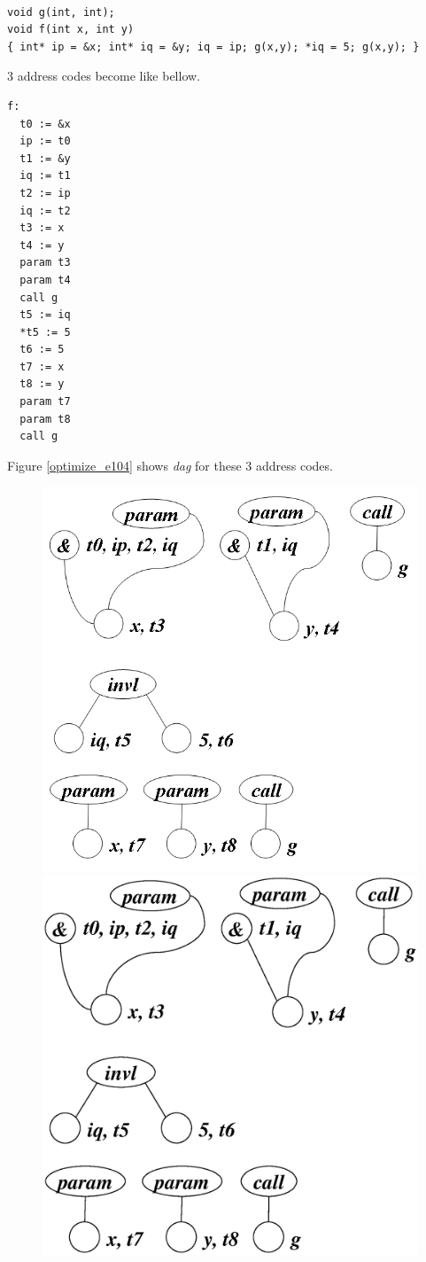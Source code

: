 \begin{Example}
\label{optimize_e103}
\begin{verbatim}

void g(int, int);
void f(int x, int y)
{ int* ip = &x; int* iq = &y; iq = ip; g(x,y); *iq = 5; g(x,y); }
\end{verbatim}
3 address codes become like bellow.
\begin{verbatim}
f:
  t0 := &x
  ip := t0
  t1 := &y
  iq := t1
  t2 := ip
  iq := t2
  t3 := x
  t4 := y
  param t3
  param t4
  call g
  t5 := iq
  *t5 := 5
  t6 := 5
  t7 := x
  t8 := y
  param t7
  param t8
  call g
\end{verbatim}
Figure \ref{optimize_e104} shows {\em dag} for these 3 address codes.
\begin{figure}[htbp]
\begin{center}
\begin{htmlonly}
\includegraphics[width=0.788\linewidth,height=0.8\linewidth]{opt045.png}
\end{htmlonly}
\begin{latexonly}
\includegraphics[width=0.788\linewidth,height=0.8\linewidth]{opt045.eps}

\end{latexonly}
\end{center}
\end{figure}
\end{Example}
